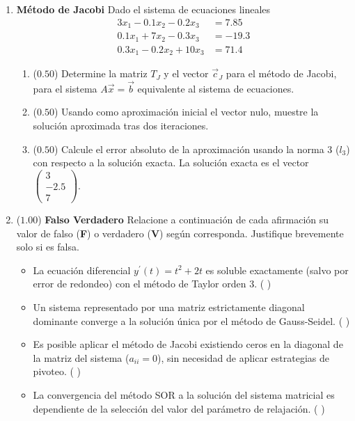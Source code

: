 \documentclass[12pt]{article}
\begin{document}
\begin{enumerate}[leftmargin=*,widest=9]
    \item \textbf{Método de Jacobi} Dado el sistema de ecuaciones lineales
    \begin{align*}
    3x_1 - 0.1x_2 - 0.2x_3 & = 7.85 \\
    0.1x_1 + 7x_2 - 0.3x_3 & = -19.3 \\
    0.3x_1 - 0.2x_2 + 10x_3 & = 71.4
    \end{align*}
    
    \begin{enumerate}[label=\alph*]

    \item ($0.50$) Determine la matriz \(T_J\) y el vector \(\vec{c}_J\) para el método de Jacobi, para el sistema \(A\vec{x}=\vec{b}\) equivalente al sistema de ecuaciones.
    \vspace{2cm}
    
    \item ($0.50$) Usando como aproximación inicial el vector nulo, muestre la solución aproximada tras dos iteraciones.
    \vspace{5cm}
    
    \item ($0.50$) Calcule el error absoluto de la aproximación usando la norma 3 (\(l_3\)) con respecto a la solución exacta. La solución exacta es el vector 
    \( \begin{pmatrix} 3 \\ -2.5 \\ 7 \end{pmatrix} \).
    \vspace{4cm}
    
    \end{enumerate}
    
    \item ($1.00$) \textbf{Falso Verdadero} Relacione a continuación de cada afirmación su valor de falso (\textbf{F}) o verdadero (\textbf{V}) según corresponda. Justifique brevemente solo si es falsa.
    
    \begin{itemize}
    \item La ecuación diferencial \(y^{\prime}(t)= t^2 + 2t\) es soluble exactamente (salvo por error de redondeo) con el método de Taylor orden 3. ( )
    \vspace{1cm}
    \item Un sistema representado por una matriz estrictamente diagonal dominante converge a la solución única por el método de Gauss-Seidel. ( )
    \vspace{1cm}
    \item Es posible aplicar el método de Jacobi existiendo ceros en la diagonal de la matriz del sistema (\(a_{ii}=0\)), sin necesidad de aplicar estrategias de pivoteo. ( )
    \vspace{1cm}
    \item La convergencia del método SOR a la solución del sistema matricial es dependiente de la selección del valor del parámetro de relajación. ( )
    \end{itemize}
    

\end{enumerate}
\end{document}
